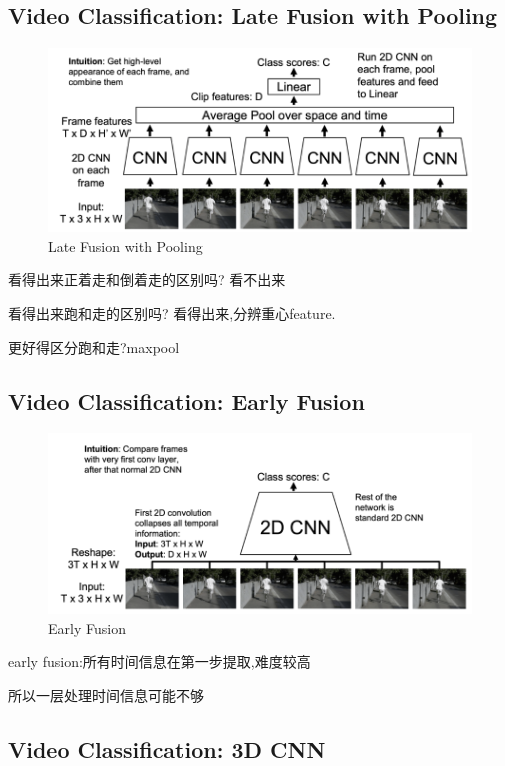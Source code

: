 \subsection{Video Classification: Late Fusion with Pooling}

\begin{figure}[htbp]
    \centering
    \includegraphics[scale=0.25]{figures/LF_pool.png}
    \caption{Late Fusion with Pooling}
\end{figure}

看得出来正着走和倒着走的区别吗? 看不出来

看得出来跑和走的区别吗? 看得出来,分辨重心feature.

更好得区分跑和走?maxpool

\subsection{Video Classification: Early Fusion}

\begin{figure}[htbp]
    \centering
    \includegraphics[scale=0.25]{figures/EF.png}
    \caption{Early Fusion}
\end{figure}

early fusion:所有时间信息在第一步提取,难度较高

所以一层处理时间信息可能不够

\subsection{Video Classification: 3D CNN}

